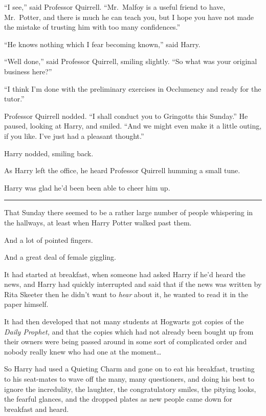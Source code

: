 ``I see,'' said Professor Quirrell. ``Mr.~Malfoy is a useful friend to
have, Mr.~Potter, and there is much he can teach you, but I hope you
have not made the mistake of trusting him with too many confidences.''

``He knows nothing which I fear becoming known,'' said Harry.

``Well done,'' said Professor Quirrell, smiling slightly. ``So what was
your original business here?''

``I think I'm done with the preliminary exercises in Occlumency and
ready for the tutor.''

Professor Quirrell nodded. ``I shall conduct you to Gringotts this
Sunday.'' He paused, looking at Harry, and smiled. ``And we might even
make it a little outing, if you like. I've just had a pleasant
thought.''

Harry nodded, smiling back.

As Harry left the office, he heard Professor Quirrell humming a small
tune.

Harry was glad he'd been been able to cheer him up.

\begin{center}\rule{3in}{0.4pt}\end{center}

That Sunday there seemed to be a rather large number of people
whispering in the hallways, at least when Harry Potter walked past them.

And a lot of pointed fingers.

And a great deal of female giggling.

It had started at breakfast, when someone had asked Harry if he'd heard
the news, and Harry had quickly interrupted and said that if the news
was written by Rita Skeeter then he didn't want to \emph{hear} about it,
he wanted to read it in the paper himself.

It had then developed that not many students at Hogwarts got copies of
the \emph{Daily Prophet,} and that the copies which had not already been
bought up from their owners were being passed around in some sort of
complicated order and nobody really knew who had one at the
moment\ldots{}

So Harry had used a Quieting Charm and gone on to eat his breakfast,
trusting to his seat-mates to wave off the many, many questioners, and
doing his best to ignore the incredulity, the laughter, the
congratulatory smiles, the pitying looks, the fearful glances, and the
dropped plates as new people came down for breakfast and heard.

